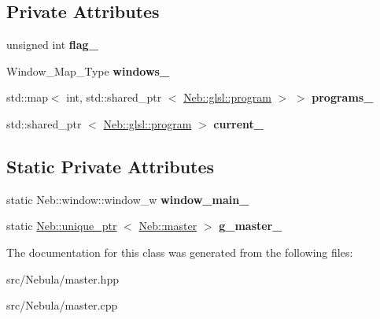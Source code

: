 \subsection*{\-Private \-Attributes}
\begin{DoxyCompactItemize}
\item 
\hypertarget{classNeb_1_1master_af71a3359ab168f9d2f7ddc58fbc20772}{unsigned int {\bfseries flag\-\_\-}}\label{classNeb_1_1master_af71a3359ab168f9d2f7ddc58fbc20772}

\item 
\hypertarget{classNeb_1_1master_afcef76720ef4ad6ce4c3a83985047f8e}{\-Window\-\_\-\-Map\-\_\-\-Type {\bfseries windows\-\_\-}}\label{classNeb_1_1master_afcef76720ef4ad6ce4c3a83985047f8e}

\item 
\hypertarget{classNeb_1_1master_a8b03fc85ddea1fa9ae61c28cc7cf8fbc}{std\-::map$<$ int, std\-::shared\-\_\-ptr\*
$<$ \hyperlink{classNeb_1_1glsl_1_1program}{\-Neb\-::glsl\-::program} $>$ $>$ {\bfseries programs\-\_\-}}\label{classNeb_1_1master_a8b03fc85ddea1fa9ae61c28cc7cf8fbc}

\item 
\hypertarget{classNeb_1_1master_a83ebd2a7ae36bde1ab9c6f23bc2fa302}{std\-::shared\-\_\-ptr\*
$<$ \hyperlink{classNeb_1_1glsl_1_1program}{\-Neb\-::glsl\-::program} $>$ {\bfseries current\-\_\-}}\label{classNeb_1_1master_a83ebd2a7ae36bde1ab9c6f23bc2fa302}

\end{DoxyCompactItemize}
\subsection*{\-Static \-Private \-Attributes}
\begin{DoxyCompactItemize}
\item 
\hypertarget{classNeb_1_1master_ab43b29dfb8f37694c89f08411a68f267}{static \-Neb\-::window\-::window\-\_\-w {\bfseries window\-\_\-main\-\_\-}}\label{classNeb_1_1master_ab43b29dfb8f37694c89f08411a68f267}

\item 
\hypertarget{classNeb_1_1master_a0151ff558558393aa9aff680a66f0c31}{static \hyperlink{classNeb_1_1unique__ptr}{\-Neb\-::unique\-\_\-ptr}\*
$<$ \hyperlink{classNeb_1_1master}{\-Neb\-::master} $>$ {\bfseries g\-\_\-master\-\_\-}}\label{classNeb_1_1master_a0151ff558558393aa9aff680a66f0c31}

\end{DoxyCompactItemize}


\-The documentation for this class was generated from the following files\-:\begin{DoxyCompactItemize}
\item 
src/\-Nebula/master.\-hpp\item 
src/\-Nebula/master.\-cpp\end{DoxyCompactItemize}
